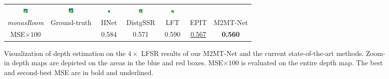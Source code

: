 \begin{figure}[ht!]
{\begin{tabular}{ccccccc}
    \includegraphics[width=0.110\textwidth, height=0.110\textwidth,cfbox=red 1pt 0pt]{img/depth/crop/monasRoom/IINet_2.png} &
    \includegraphics[width=0.110\textwidth, height=0.110\textwidth,cfbox=red 1pt 0pt]{img/depth/crop/monasRoom/DistgSSR_2.png} &
    \includegraphics[width=0.110\textwidth, height=0.110\textwidth,cfbox=red 1pt 0pt]{img/depth/crop/monasRoom/LFT_2.png} &
    \includegraphics[width=0.110\textwidth, height=0.110\textwidth,cfbox=red 1pt 0pt]{img/depth/crop/monasRoom/EPIT_2.png} &
    \includegraphics[width=0.110\textwidth, height=0.110\textwidth,cfbox=red 1pt 0pt]{img/depth/crop/monasRoom/SATNet_2.png} \\
    
    \textit{monasRoom} &
    Ground-truth &
    IINet \cite{liuLFIINet_TMM2021} &
    DistgSSR \cite{wangDistgSSR_TIP2022} &
    LFT \cite{liangLFT_SPL2022} &
    EPIT \cite{liangEPIT_arXiv2023} &
    M2MT-Net \\

    MSE$\times100$ &
    &
    0.584 &
    0.571 &
    0.590 &
    \underline{0.567} &
    \textbf{0.560} \\

    \end{tabular}
    }
    \caption{Visualization of depth estimation on the $4\times$ LFSR results of our M2MT-Net and the current state-of-the-art methods. Zoom-in depth maps are depicted on the areas in the blue and red boxes. MSE$\times 100$ is evaluated on the entire depth map. The best and second-best MSE are in bold and underlined.}
    \label{fig:Depth}
\end{figure}
    